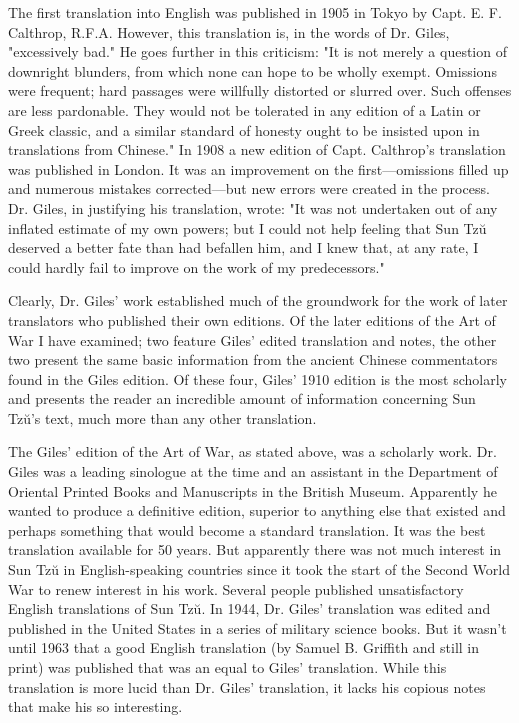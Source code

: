 \documentclass[10pt,a4paper]{book}
\begin{document}
The first translation into English was published in 1905 in Tokyo by Capt. E. F. Calthrop, R.F.A. However, this translation is, in the words of Dr. Giles, "excessively bad." He goes further in this criticism: "It is not merely a question of downright blunders, from which none can hope to be wholly exempt. Omissions were frequent; hard passages were willfully distorted or slurred over. Such offenses are less pardonable. They would not be tolerated in any edition of a Latin or Greek classic, and a similar standard of honesty ought to be insisted upon in translations from Chinese." In 1908 a new edition of Capt. Calthrop’s translation was published in London. It was an improvement on the first—omissions filled up and numerous mistakes corrected—but new errors were created in the process. Dr. Giles, in justifying his translation, wrote: "It was not undertaken out of any inflated estimate of my own powers; but I could not help feeling that Sun Tzŭ deserved a better fate than had befallen him, and I knew that, at any rate, I could hardly fail to improve on the work of my predecessors." 

\newpage
Clearly, Dr. Giles’ work established much of the groundwork for the work of later translators who published their own editions. Of the later editions of the Art of War I have examined; two feature Giles’ edited translation and notes, the other two present the same basic information from the ancient Chinese commentators found in the Giles edition. Of these four, Giles’ 1910 edition is the most scholarly and presents the reader an incredible amount of information concerning Sun Tzŭ’s text, much more than any other translation.

The Giles’ edition of the Art of War, as stated above, was a scholarly work. Dr. Giles was a leading sinologue at the time and an assistant in the Department of Oriental Printed Books and Manuscripts in the British Museum. Apparently he wanted to produce a definitive edition, superior to anything else that existed and perhaps something that would become a standard translation. It was the best translation available for 50 years. But apparently there was not much interest in Sun Tzŭ in English-speaking countries since it took the start of the Second World War to renew interest in his work. Several people published unsatisfactory English translations of Sun Tzŭ. In 1944, Dr. Giles’ translation was edited and published in the United States in a series of military science books. But it wasn’t until 1963 that a good English translation (by Samuel B. Griffith and still in print) was published that was an equal to Giles’ translation. While this translation is more lucid than Dr. Giles’ translation, it lacks his copious notes that make his so interesting. 
\end{document}

